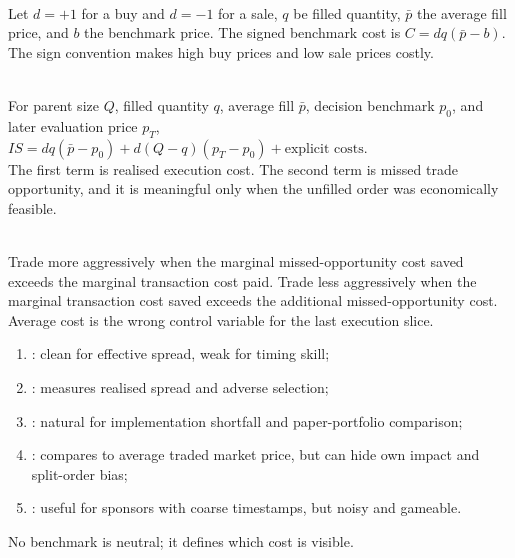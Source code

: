 \documentclass[a4paper,oneside,openany]{book}
\begin{document}
\begin{model} \\
Let $d=+1$ for a buy and $d=-1$ for a sale, $q$ be filled quantity, $\bar{p}$ the average fill price, and $b$ the benchmark price. The signed benchmark cost is $C=dq(\bar{p}-b)$.\\
The sign convention makes high buy prices and low sale prices costly.
\end{model}

\begin{model} \\
For parent size $Q$, filled quantity $q$, average fill $\bar{p}$, decision benchmark $p_0$, and later evaluation price  $p_T$,\\
$IS=dq(\bar{p}-p_0)+d(Q-q)(p_T-p_0)+\text{explicit costs}$.\\
The first term is realised execution cost. The second term is missed trade opportunity, and it is meaningful only when the unfilled order was economically feasible.
\end{model}

\begin{principle} \\
Trade more aggressively when the marginal missed-opportunity cost saved exceeds the marginal transaction cost paid. Trade less aggressively when the marginal transaction cost saved exceeds the additional missed-opportunity cost. Average cost is the wrong control variable for the last execution slice.
\end{principle}

\begin{taxonomy} 
\begin{enumerate}[label=\roman*.]
\setlength{\itemsep}{0pt}
\item {}: clean for effective spread, weak for timing skill;
\item {}: measures realised spread and adverse selection;
\item {}: natural for implementation shortfall and paper-portfolio comparison;
\item {}: compares to average traded market price, but can hide own impact and split-order bias;
\item {}: useful for sponsors with coarse timestamps, but noisy and gameable.
\end{enumerate}
No benchmark is neutral; it defines which cost is visible.
\end{taxonomy}
\end{document}
